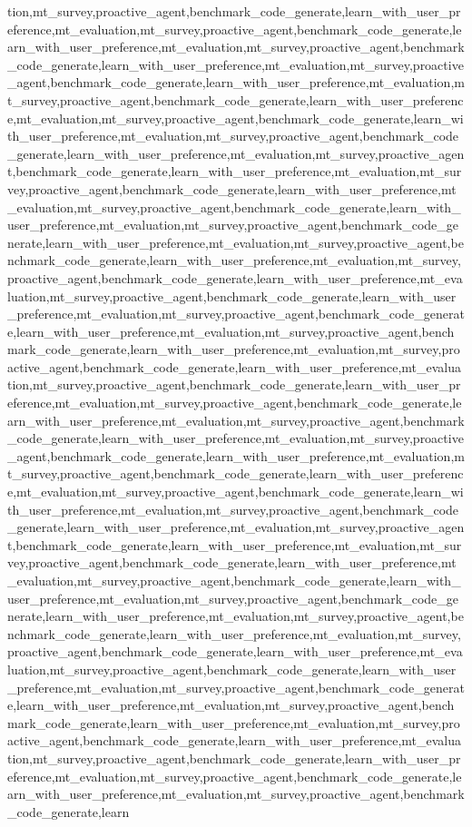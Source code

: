 tion,mt_survey,proactive_agent,benchmark_code_generate,learn_with_user_preference,mt_evaluation,mt_survey,proactive_agent,benchmark_code_generate,learn_with_user_preference,mt_evaluation,mt_survey,proactive_agent,benchmark_code_generate,learn_with_user_preference,mt_evaluation,mt_survey,proactive_agent,benchmark_code_generate,learn_with_user_preference,mt_evaluation,mt_survey,proactive_agent,benchmark_code_generate,learn_with_user_preference,mt_evaluation,mt_survey,proactive_agent,benchmark_code_generate,learn_with_user_preference,mt_evaluation,mt_survey,proactive_agent,benchmark_code_generate,learn_with_user_preference,mt_evaluation,mt_survey,proactive_agent,benchmark_code_generate,learn_with_user_preference,mt_evaluation,mt_survey,proactive_agent,benchmark_code_generate,learn_with_user_preference,mt_evaluation,mt_survey,proactive_agent,benchmark_code_generate,learn_with_user_preference,mt_evaluation,mt_survey,proactive_agent,benchmark_code_generate,learn_with_user_preference,mt_evaluation,mt_survey,proactive_agent,benchmark_code_generate,learn_with_user_preference,mt_evaluation,mt_survey,proactive_agent,benchmark_code_generate,learn_with_user_preference,mt_evaluation,mt_survey,proactive_agent,benchmark_code_generate,learn_with_user_preference,mt_evaluation,mt_survey,proactive_agent,benchmark_code_generate,learn_with_user_preference,mt_evaluation,mt_survey,proactive_agent,benchmark_code_generate,learn_with_user_preference,mt_evaluation,mt_survey,proactive_agent,benchmark_code_generate,learn_with_user_preference,mt_evaluation,mt_survey,proactive_agent,benchmark_code_generate,learn_with_user_preference,mt_evaluation,mt_survey,proactive_agent,benchmark_code_generate,learn_with_user_preference,mt_evaluation,mt_survey,proactive_agent,benchmark_code_generate,learn_with_user_preference,mt_evaluation,mt_survey,proactive_agent,benchmark_code_generate,learn_with_user_preference,mt_evaluation,mt_survey,proactive_agent,benchmark_code_generate,learn_with_user_preference,mt_evaluation,mt_survey,proactive_agent,benchmark_code_generate,learn_with_user_preference,mt_evaluation,mt_survey,proactive_agent,benchmark_code_generate,learn_with_user_preference,mt_evaluation,mt_survey,proactive_agent,benchmark_code_generate,learn_with_user_preference,mt_evaluation,mt_survey,proactive_agent,benchmark_code_generate,learn_with_user_preference,mt_evaluation,mt_survey,proactive_agent,benchmark_code_generate,learn_with_user_preference,mt_evaluation,mt_survey,proactive_agent,benchmark_code_generate,learn_with_user_preference,mt_evaluation,mt_survey,proactive_agent,benchmark_code_generate,learn_with_user_preference,mt_evaluation,mt_survey,proactive_agent,benchmark_code_generate,learn_with_user_preference,mt_evaluation,mt_survey,proactive_agent,benchmark_code_generate,learn_with_user_preference,mt_evaluation,mt_survey,proactive_agent,benchmark_code_generate,learn_with_user_preference,mt_evaluation,mt_survey,proactive_agent,benchmark_code_generate,learn_with_user_preference,mt_evaluation,mt_survey,proactive_agent,benchmark_code_generate,learn_with_user_preference,mt_evaluation,mt_survey,proactive_agent,benchmark_code_generate,learn_with_user_preference,mt_evaluation,mt_survey,proactive_agent,benchmark_code_generate,learn_with_user_preference,mt_evaluation,mt_survey,proactive_agent,benchmark_code_generate,learn
